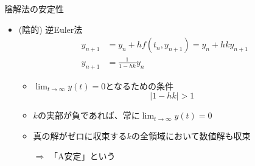 \begin{frame}[t,fragile]{陰解法の安定性}
  \begin{itemize}
  \item (陰的) 逆Euler法
    \begin{align*}
    y_{n+1} &= y_n + h f(t_n,y_{n+1}) = y_n + h k y_{n+1} \\
    y_{n+1} &= \frac{1}{1-hk} y_n
    \end{align*}
    \begin{itemize}
    \item $\displaystyle \lim_{t\rightarrow \infty} y(t) = 0$となるための条件
      \[
      |  1 - hk | > 1
      \]
    \item $k$の実部が負であれば、常に$\displaystyle \lim_{t\rightarrow \infty} y(t) = 0$
    \item 真の解がゼロに収束する$k$の全領域において数値解も収束

      $\Rightarrow$ 「A安定」という
    \end{itemize}
  \end{itemize}
\end{frame}
